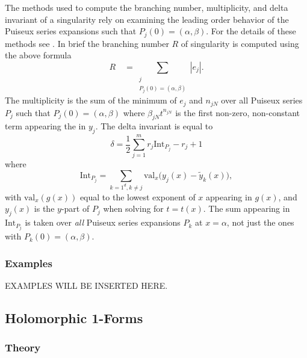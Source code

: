 The methods used to compute the branching number, multiplicity, and
delta invariant of a singularity rely on examining the leading order
behavior of the Puiseux series expansions such that $P_j(0) = (\alpha,
\beta)$. For the details of these methods see
\cite{DeconinckPatterson11}. In brief the branching number $R$ of
singularity is computed using the above formula
\[
    R \quad = \sum_{\substack{j \\ P_j(0)=(\alpha,\beta)}} |e_j|.
\]
The multiplicity is the sum of the minimum of $e_j$ and $n_{jN}$ over
all Puiseux series $P_j$ such that $P_j(0) = (\alpha,\beta)$ where
$\beta_{jN} t ^{n_{jN}}$ is the first non-zero, non-constant term
appearing the in $y_j$. The delta invariant is equal to
\[
    \delta = \frac{1}{2}\sum_{j=1}^m r_j \text{Int}_{P_j} - r_j + 1
\]
where
\[
    \text{Int}_{P_j} = \sum_{k=1^d, k \neq j}
    \text{val}_x \big( y_j(x) - \tilde{y}_k(x) \big),
\]
with $\text{val}_x( g(x))$ equal to the lowest exponent of $x$ appearing
in $g(x)$, and $y_j(x)$ is the $y$-part of $P_j$ when solving for $t =
t(x)$. The sum appearing in $\text{Int}_{P_j}$ is taken over {\it all}
Puiseux series expansions $P_k$ at $x = \alpha$, not just the ones with
$P_k(0) = (\alpha, \beta)$.



%
\subsubsection*{Examples}
%

\vspace{24pt}

EXAMPLES WILL BE INSERTED HERE.

\vspace{24pt}

\subsection{Holomorphic 1-Forms}

%
\subsubsection*{Theory}
%

